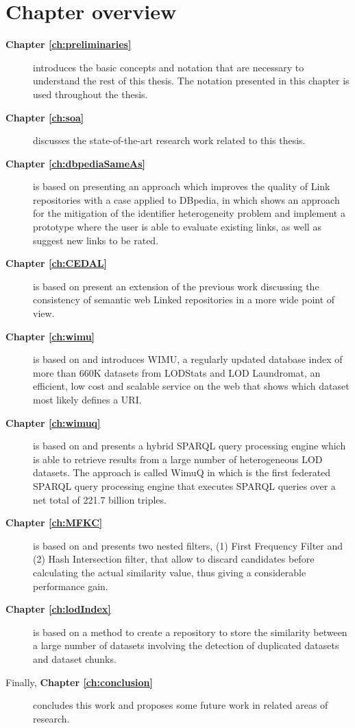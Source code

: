 \section{Chapter overview}
\begin{description}
    \item[\textbf{Chapter \ref{ch:preliminaries}}] introduces the basic concepts and notation that are necessary to understand the rest of this thesis. The notation presented in this chapter is used throughout the thesis.
    \item[\textbf{Chapter \ref{ch:soa}}] discusses the state-of-the-art research work related to this thesis.
    \item[\textbf{Chapter \ref{ch:dbpediaSameAs}}] is based on \cite{valdestilhasdbpediasameas} presenting an approach which improves the quality of Link repositories with a case applied to DBpedia, in which shows an approach for the mitigation of the identifier heterogeneity problem and implement a prototype where the user is able to evaluate existing links, as well as suggest new links to be rated.
    \item[\textbf{Chapter \ref{ch:CEDAL}}] is based on \cite{valdestilhas2017cedal} present an extension of the previous work \cite{valdestilhasdbpediasameas} discussing the consistency of semantic web Linked repositories in a more wide point of view.
    \item[\textbf{Chapter \ref{ch:wimu}}] is based on \cite{valdestilhas2018my} and introduces WIMU, a regularly updated database index of more than 660K datasets from LODStats and LOD Laundromat, an efficient, low cost and scalable service on the web that shows which dataset most likely defines a URI.
    \item[\textbf{Chapter \ref{ch:wimuq}}] is based on \cite{ValdestilhasKcap} and presents a hybrid SPARQL query processing engine which is able to retrieve results from a large number of heterogeneous LOD datasets. The approach is called WimuQ in which is the first federated SPARQL query processing engine that executes SPARQL queries over a net total of 221.7 billion triples.
    \item[\textbf{Chapter \ref{ch:MFKC}}] is based on \cite{valdestilhas2017high} and presents two nested filters, (1) First Frequency Filter and (2) Hash Intersection filter, that allow to discard candidates before calculating the actual similarity value, thus giving a considerable performance gain.
    \item[\textbf{Chapter \ref{ch:lodIndex}}] is based on \cite{valdestilhas2019ReLOD} a method to create a repository to store the similarity between a large number of datasets involving the detection of duplicated datasets and dataset chunks. %
    \item[Finally, \textbf{Chapter \ref{ch:conclusion}}] concludes this work and proposes some future work in related areas of research.
\end{description}
